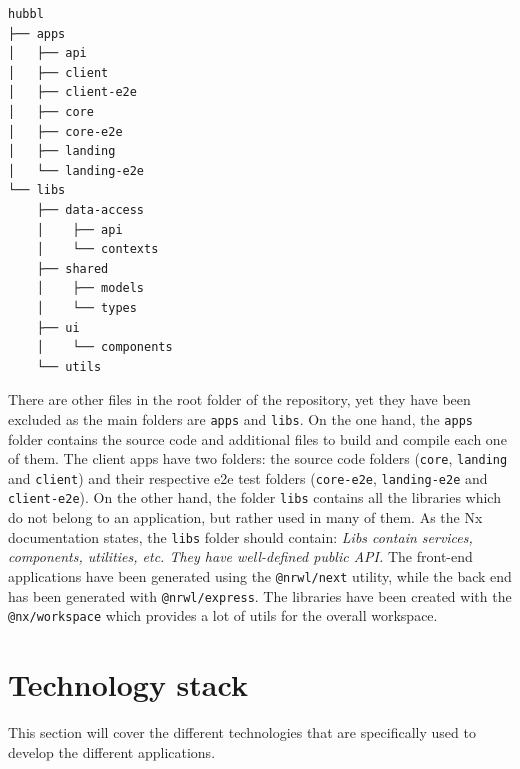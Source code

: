 \documentclass[a4paper, 12pt, oneside]{book}
\begin{document}
\begin{verbatim}
hubbl
├── apps
│   ├── api
│   ├── client
│   ├── client-e2e
│   ├── core
│   ├── core-e2e
│   ├── landing
│   └── landing-e2e
└── libs
    ├── data-access
    │    ├── api
    │    └── contexts
    ├── shared
    │    ├── models
    │    └── types
    ├── ui
    │    └── components
    └── utils
\end{verbatim}
There are other files in the root folder of the repository, yet they have been excluded as the main folders are \texttt{apps} and \texttt{libs}. On the one hand, the \texttt{apps} folder contains the source code and additional files to build and compile each one of them. The client apps have two folders: the source code folders (\texttt{core}, \texttt{landing} and \texttt{client}) and their respective e2e test folders (\texttt{core-e2e}, \texttt{landing-e2e} and \texttt{client-e2e}). On the other hand, the folder \texttt{libs} contains all the libraries which do not belong to an application, but rather used in many of them. As the Nx documentation states, the \texttt{libs} folder should contain: \emph{Libs contain services, components, utilities, etc. They have well-defined public API.} The front-end applications have been generated using the \texttt{@nrwl/next} utility, while the back end has been generated with \texttt{@nrwl/express}. The libraries have been created with the \texttt{@nx/workspace} which provides a lot of utils for the overall workspace.
\section{Technology stack}
This section will cover the different technologies that are specifically used to develop the different applications.
\end{document}
